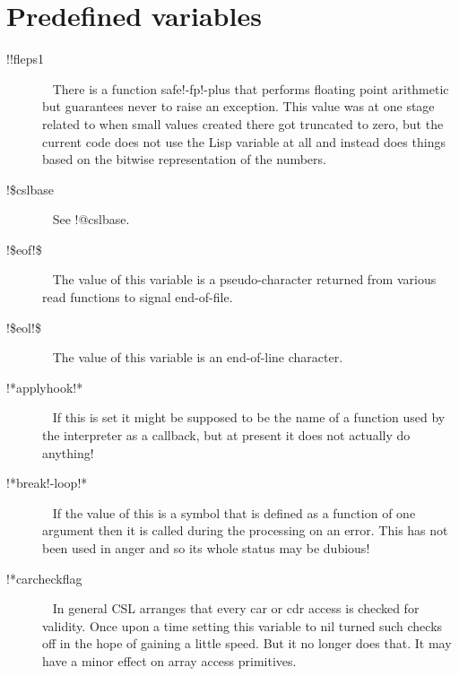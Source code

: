 \documentclass[a4paper,11pt]{article}
\begin{document}
\section{Predefined variables}
\begin{description}

\item [{\ttfamily !!fleps1}]  ~\newline
There is a function safe!-fp!-plus that performs floating point
arithmetic but guarantees never to raise an exception. This value was
at one stage related to when small values created there got truncated to zero,
but the current code does not use the Lisp variable at all and instead does
things based on the bitwise representation of the numbers.

\item [{\ttfamily !\$cslbase}]  ~\newline
See {\ttfamily !@cslbase}.

\item [{\ttfamily !\$eof!\$}]  ~\newline
The value of this variable is a pseudo-character returned from various
read functions to signal end-of-file.

\item [{\ttfamily !\$eol!\$}] ~\newline
The value of this variable is an end-of-line character.

\item [{\ttfamily !*applyhook!*}]  ~\newline
If this is set it might be supposed to be the name of a function used
by the interpreter as a callback, but at present it does not actually do
anything!

\item [{\ttfamily !*break!-loop!*}]  ~\newline
If the value of this is a symbol that is defined as a function of one
argument then it is called during the processing on an error. This has not
been used in anger and so its whole status may be dubious!

\item [{\ttfamily !*carcheckflag}]  ~\newline
In general CSL arranges that every {\ttfamily car} or {\ttfamily cdr} access
is checked for validity. Once upon a time setting this variable to nil
turned such checks off in the hope of gaining a little speed. But it no
longer does that. It may have a minor effect on array access primitives.


\end{description}
\end{document}
